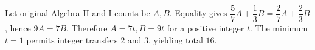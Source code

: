 Let original Algebra II and I counts be $ A,B $. Equality gives $\dfrac{5}{7}A+\dfrac{1}{3}B=\dfrac{2}{7}A+\dfrac{2}{3}B $, hence $ 9A=7B $. Therefore $ A=7t,B=9t $ for a positive integer $ t $. The minimum $ t=1 $ permits integer transfers 2 and 3, yielding total $\boxed{16}$.
